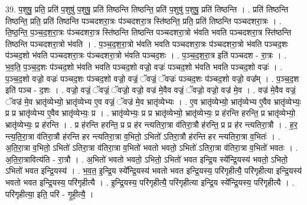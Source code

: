 \documentclass[17pt]{extarticle}
\begin{document}
39. प॒शुषु॒ प्रति॒ प्रति॑ प॒शुषु॑ प॒शुषु॒ प्रति॑ तिष्ठन्ति तिष्ठन्ति॒ प्रति॑ प॒शुषु॑ प॒शुषु॒ प्रति॑ तिष्ठन्ति । . प्रति॑ तिष्ठन्ति तिष्ठन्ति॒ प्रति॒ प्रति॑ तिष्ठन्ति पञ्चदशरा॒त्रः प॑ञ्चदशरा॒त्र स्ति॑ष्ठन्ति॒ प्रति॒ प्रति॑ तिष्ठन्ति पञ्चदशरा॒त्रः । . ति॒ष्ठ॒न्ति॒ प॒ञ्च॒द॒श॒रा॒त्रः प॑ञ्चदशरा॒त्र स्ति॑ष्ठन्ति तिष्ठन्ति पञ्चदशरा॒त्रो भ॑वति भवति पञ्चदशरा॒त्र स्ति॑ष्ठन्ति तिष्ठन्ति पञ्चदशरा॒त्रो भ॑वति । . प॒ञ्च॒द॒श॒रा॒त्रो भ॑वति भवति पञ्चदशरा॒त्रः प॑ञ्चदशरा॒त्रो भ॑वति पञ्चद॒शः प॑ञ्चद॒शो भ॑वति पञ्चदशरा॒त्रः प॑ञ्चदशरा॒त्रो भ॑वति पञ्चद॒शः । . प॒ञ्च॒द॒श॒रा॒त्र इति॑ पञ्चदश - रा॒त्रः । . भ॒व॒ति॒ प॒ञ्च॒द॒शः प॑ञ्चद॒शो भ॑वति भवति पञ्चद॒शो वज्रो॒ वज्रः॑ पञ्चद॒शो भ॑वति भवति पञ्चद॒शो वज्रः॑ । . प॒ञ्च॒द॒शो वज्रो॒ वज्रः॑ पञ्चद॒शः प॑ञ्चद॒शो वज्रो॒ वज्रं॒ ॅवज्रं॒ ॅवज्रः॑ पञ्चद॒शः प॑ञ्चद॒शो वज्रो॒ वज्र᳚म् । . प॒ञ्च॒द॒श इति॑ पञ्च - द॒शः । . वज्रो॒ वज्रं॒ ॅवज्रं॒ ॅवज्रो॒ वज्रो॒ वज्र॑ मे॒वैव वज्रं॒ ॅवज्रो॒ वज्रो॒ वज्र॑ मे॒व । . वज्र॑ मे॒वैव वज्रं॒ ॅवज्र॑ मे॒व भ्रातृ॑व्येभ्यो॒ भ्रातृ॑व्येभ्य ए॒व वज्रं॒ ॅवज्र॑ मे॒व भ्रातृ॑व्येभ्यः । . ए॒व भ्रातृ॑व्येभ्यो॒ भ्रातृ॑व्येभ्य ए॒वैव भ्रातृ॑व्येभ्यः॒ प्र प्र भ्रातृ॑व्येभ्य ए॒वैव भ्रातृ॑व्येभ्यः॒ प्र । . भ्रातृ॑व्येभ्यः॒ प्र प्र भ्रातृ॑व्येभ्यो॒ भ्रातृ॑व्येभ्यः॒ प्र ह॑रन्ति हरन्ति॒ प्र भ्रातृ॑व्येभ्यो॒ भ्रातृ॑व्येभ्यः॒ प्र ह॑रन्ति । . प्र ह॑रन्ति हरन्ति॒ प्र प्र ह॑र न्त्यतिरा॒त्रा व॑तिरा॒त्रौ ह॑रन्ति॒ प्र प्र ह॑र न्त्यतिरा॒त्रौ । . ह॒र॒ न्त्य॒ति॒रा॒त्रा व॑तिरा॒त्रौ ह॑रन्ति हर न्त्यतिरा॒त्रा व॒भितो॒ ऽभितो॑ ऽतिरा॒त्रौ ह॑रन्ति हर न्त्यतिरा॒त्रा व॒भितः॑ । . अ॒ति॒रा॒त्रा व॒भितो॒ ऽभितो॑ ऽतिरा॒त्रा व॑तिरा॒त्रा व॒भितो॑ भवतो भवतो॒ ऽभितो॑ ऽतिरा॒त्रा व॑तिरा॒त्रा व॒भितो॑ भवतः । . अ॒ति॒रा॒त्रावित्य॑ति - रा॒त्रौ । . अ॒भितो॑ भवतो भवतो॒ ऽभितो॒ ऽभितो॑ भवत इन्द्रि॒य स्ये᳚न्द्रि॒यस्य॑ भवतो॒ ऽभितो॒ ऽभितो॑ भवत इन्द्रि॒यस्य॑ । . भ॒व॒त॒ इ॒न्द्रि॒य स्ये᳚न्द्रि॒यस्य॑ भवतो भवत इन्द्रि॒यस्य॒ परि॑गृहीत्यै॒ परि॑गृहीत्या इन्द्रि॒यस्य॑ भवतो भवत इन्द्रि॒यस्य॒ परि॑गृहीत्यै । . इ॒न्द्रि॒यस्य॒ परि॑गृहीत्यै॒ परि॑गृहीत्या इन्द्रि॒य स्ये᳚न्द्रि॒यस्य॒ परि॑गृहीत्यै । . परि॑गृहीत्या॒ इति॒ परि॑ - गृ॒ही॒त्यै॒ । \newline
\pagebreak
{}
\end{document}
